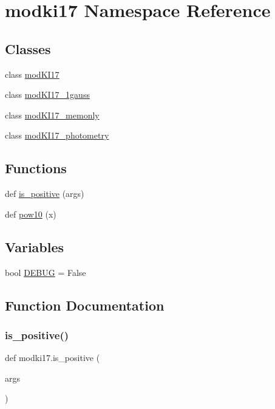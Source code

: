 \hypertarget{namespacemodki17}{}\section{modki17 Namespace Reference}
\label{namespacemodki17}
\subsection*{Classes}
\begin{DoxyCompactItemize}
\item 
class \hyperlink{classmodki17_1_1modKI17}{mod\+K\+I17}
\item 
class \hyperlink{classmodki17_1_1modKI17__1gauss}{mod\+K\+I17\+\_\+1gauss}
\item 
class \hyperlink{classmodki17_1_1modKI17__memonly}{mod\+K\+I17\+\_\+memonly}
\item 
class \hyperlink{classmodki17_1_1modKI17__photometry}{mod\+K\+I17\+\_\+photometry}
\end{DoxyCompactItemize}
\subsection*{Functions}
\begin{DoxyCompactItemize}
\item 
def \hyperlink{namespacemodki17_a12f4b9926b321d64b51a76533be122e2}{is\+\_\+positive} (args)
\item 
def \hyperlink{namespacemodki17_ada83ead5e6085ed227b1e64d233eea03}{pow10} (x)
\end{DoxyCompactItemize}
\subsection*{Variables}
\begin{DoxyCompactItemize}
\item 
bool \hyperlink{namespacemodki17_a86807df4fe7d08c11ff4266c9e5dd9ac}{D\+E\+B\+UG} = False
\end{DoxyCompactItemize}


\subsection{Function Documentation}
\mbox{\label{namespacemodki17_a12f4b9926b321d64b51a76533be122e2}} 
\subsubsection{\texorpdfstring{is\+\_\+positive()}{is\_positive()}}
{\footnotesize\ttfamily def modki17.\+is\+\_\+positive (\begin{DoxyParamCaption}\item[{}]{args }\end{DoxyParamCaption})}



